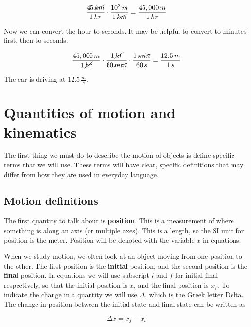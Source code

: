 \documentclass[12pt]{book}
\begin{document}
\begin{equation}
\frac{45 \, \cancel{km}}{1 \, hr} \cdot \frac{10^3 \, m}{1 \, \cancel{km}} = \frac{45,000 \, m}{1 \, hr}
\end{equation}

Now we can convert the hour to seconds. It may be helpful to convert to minutes first, then to seconds.

\begin{equation}
\frac{45,000 \, m}{1 \, \cancel{hr}} \cdot \frac{1 \, \cancel{hr}}{60 \, \cancel{min}} \cdot \frac{1 \, \cancel{min}}{60 \, s} = \frac{12.5 \, m}{1 \, s}
\end{equation}

The car is driving at $12.5 \, \frac{m}{s}$.



\chapter{Quantities of motion and kinematics}
\setcounter{example}{1}
\addtocounter{chp}{1}

The first thing we must do to describe the motion of objects is define specific terms that we will use. These terms will have clear, specific definitions that may differ from how they are used in everyday language. 

\section{Motion definitions}

The first quantity to talk about is \textbf{position}. This is a measurement of where something is along an axis (or multiple axes). This is a length, so the SI unit for position is the meter. Position will be denoted with the variable $x$ in equations.

When we study motion, we often look at an object moving from one position to the other. The first position is the \textbf{initial} position, and the second position is the \textbf{final} position. In equations we will use subscript $i$ and $f$ for initial final respectively, so that the initial position is $x_i$ and the final position is $x_f$. To indicate the change in a quantity we will use $\Delta$, which is the Greek letter Delta. The change in position between the initial state and final state can be written as

\begin{equation}
\Delta x = x_f - x_i
\end{equation}
\end{document}
